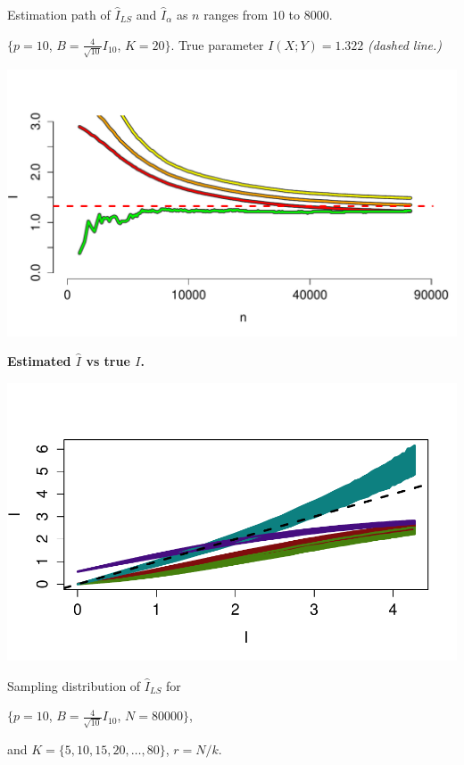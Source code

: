 \documentclass[12pt]{article}
\begin{document}
Estimation path of $\hat{I}_{LS}$ and $\hat{I}_\alpha$ as $n$ ranges from $10$ to $8000$.

\small{$\{p = 10$, $B = \frac{4}{\sqrt{10}} I_{10}$, $K = 20\}$.
True parameter $I(X; Y) = 1.322$ \emph{(dashed line.)}}

\begin{center}
\includegraphics[scale = 0.4]{../info_theory_sims/fig3.pdf}
\end{center}

\begin{center}
\textbf{Estimated $\hat{I}$ vs true $I$.} 

\includegraphics[scale = 0.5, clip=true, trim=0.4in 0.5in 0 0.5in]{../info_theory_sims/fig4.pdf}
\end{center}

Sampling distribution of $\hat{I}_{LS}$ for \small{$\{p = 10$, $B = \frac{4}{\sqrt{10}} I_{10}$, $N = 80000\}$,

and $K = \{5, 10, 15, 20, \hdots, 80\}$, $r = N/k$.}
\end{document}
